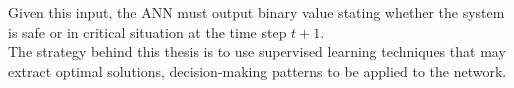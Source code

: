 \noindent Given this input, the \gls{ANN} must output binary value stating whether the system is safe or in critical situation at the time step $t+1$. \\

The strategy behind this thesis is to use supervised learning techniques that may extract optimal solutions, decision-making patterns to be applied to the network.



